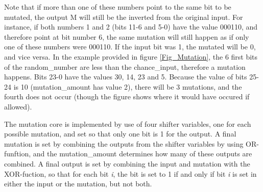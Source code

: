 Note that if more than one of these numbers point to the same bit to be mutated, the output M will still be the inverted from the original input. For instance, if both numbers 1 and 2 (bits 11-6 and 5-0) have the value 000110, and therefore point at bit number 6, the same mutation will still happen as if only one of these numbers were 000110. If the input bit was 1, the mutated will be 0, and vice versa.
In the example provided in figure \ref{Fig_Mutation}, the 6 first bits of the random\_number are less than the chance\_input, therefore a mutation happens. Bits 23-0 have the values 30, 14, 23 and 5. Because the value of bits 25-24 is 10 (mutation\_amount has value 2), there will be 3 mutations, and the fourth does not occur (though the figure shows where it would have occured if allowed).

The mutation core is implemented by use of four shifter variables, one for each possible mutation, and set so that only one bit is 1 for the output. A final mutation is set by combining the outputs from the shifter variables by using OR-funftion, and the mutation\_amount determines how many of these outputs are combined. A final output is set by combining the input and mutation with the XOR-fuction, so that for each bit \emph{i}, the bit is set to 1 if and only if bit \emph{i} is set in either the input or the mutation, but not both.

